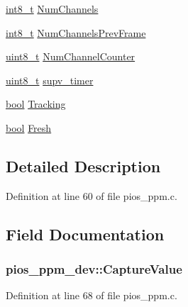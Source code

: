 \begin{DoxyCompactItemize}
\item 
\hyperlink{stdint_8h_ad566f6541e98b74246db1a3a3a85ad49}{int8\-\_\-t} \hyperlink{structpios__ppm__dev_ad22d6ba25b163e89459fa089bb3a3d45}{Num\-Channels}
\item 
\hyperlink{stdint_8h_ad566f6541e98b74246db1a3a3a85ad49}{int8\-\_\-t} \hyperlink{structpios__ppm__dev_ac648f6b4bdf6793c422676689daaca77}{Num\-Channels\-Prev\-Frame}
\item 
\hyperlink{stdint_8h_aba7bc1797add20fe3efdf37ced1182c5}{uint8\-\_\-t} \hyperlink{structpios__ppm__dev_aace8701f1500560123d6eccc8a5150c3}{Num\-Channel\-Counter}
\item 
\hyperlink{stdint_8h_aba7bc1797add20fe3efdf37ced1182c5}{uint8\-\_\-t} \hyperlink{structpios__ppm__dev_a8fdc1201ea1c7fe32a543a16a7b82be6}{supv\-\_\-timer}
\item 
\hyperlink{group___exported__types_gaf6a258d8f3ee5206d682d799316314b1}{bool} \hyperlink{structpios__ppm__dev_a70b81899f6e07040bde7d33575b7c7ac}{Tracking}
\item 
\hyperlink{group___exported__types_gaf6a258d8f3ee5206d682d799316314b1}{bool} \hyperlink{structpios__ppm__dev_a276c9eba5e4511f04af792d37819f808}{Fresh}
\end{DoxyCompactItemize}


\subsection{Detailed Description}


Definition at line 60 of file pios\-\_\-ppm.\-c.



\subsection{Field Documentation}
\hypertarget{structpios__ppm__dev_af78c364c08454847be99632c8a2f4bdf}{
\subsubsection[{Capture\-Value}]{ pios\-\_\-ppm\-\_\-dev\-::\-Capture\-Value}}\label{structpios__ppm__dev_af78c364c08454847be99632c8a2f4bdf}


Definition at line 68 of file pios\-\_\-ppm.\-c.

